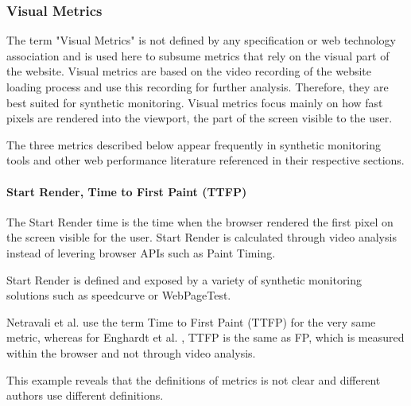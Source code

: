 
\subsubsection{Visual Metrics} %

The term "Visual Metrics" is not defined by any specification or web technology association and is used here to subsume metrics that rely on the visual part of the website.
Visual metrics are based on the video recording of the website loading process and use this recording for further analysis.
Therefore, they are best suited for synthetic monitoring.
Visual metrics focus mainly on how fast pixels are rendered into the viewport, the part of the screen visible to the user.

The three metrics described below appear frequently in synthetic monitoring tools and other web performance literature referenced in their respective sections.





\paragraph{Start Render, Time to First Paint (TTFP)}

The Start Render time is the time when the browser rendered the first pixel on the screen visible for the user.
Start Render is calculated through video analysis instead of levering browser APIs such as Paint Timing.

Start Render is defined and exposed by a variety of synthetic monitoring solutions such as speedcurve or WebPageTest.

Netravali et al. use the term Time to First Paint (TTFP) for the very same metric, %
whereas for Enghardt et al. , TTFP is the same as FP, which is measured within the browser and not through video analysis. %

This example reveals that the definitions of metrics is not clear and different authors use different definitions.





